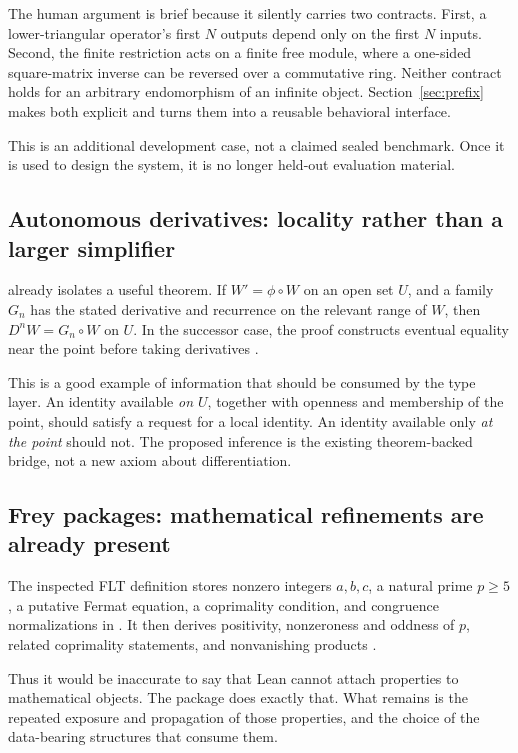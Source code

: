 \documentclass[11pt,a4paper]{article}
\newcommand{\code}[1]{\texttt{\detokenize{#1}}}
\theoremstyle{plain}
\theoremstyle{definition}
\begin{document}
The human argument is brief because it silently carries two contracts. First, a lower-triangular operator's first $N$ outputs depend only on the first $N$ inputs. Second, the finite restriction acts on a finite free module, where a one-sided square-matrix inverse can be reversed over a commutative ring. Neither contract holds for an arbitrary endomorphism of an infinite object. Section~\ref{sec:prefix} makes both explicit and turns them into a reusable behavioral interface.

This is an additional development case, not a claimed sealed benchmark. Once it is used to design the system, it is no longer held-out evaluation material.

\subsection{Autonomous derivatives: locality rather than a larger simplifier}
 already isolates a useful theorem. If $W'=\phi\circ W$ on an open set $U$, and a family $G_n$ has the stated derivative and recurrence on the relevant range of $W$, then $D^nW=G_n\circ W$ on $U$. In the successor case, the proof constructs eventual equality near the point before taking derivatives \cite{autonomous}.

This is a good example of information that should be consumed by the type layer. An identity available \emph{on $U$}, together with openness and membership of the point, should satisfy a request for a local identity. An identity available only \emph{at the point} should not. The proposed inference is the existing theorem-backed bridge, not a new axiom about differentiation.

\subsection{Frey packages: mathematical refinements are already present}
The inspected FLT definition stores nonzero integers $a,b,c$, a natural prime $p\ge5$, a putative Fermat equation, a coprimality condition, and congruence normalizations in \code{FreyPackage}. It then derives positivity, nonzeroness and oddness of $p$, related coprimality statements, and nonvanishing products \cite{frey}.

Thus it would be inaccurate to say that Lean cannot attach properties to mathematical objects. The package does exactly that. What remains is the repeated exposure and propagation of those properties, and the choice of the data-bearing structures that consume them.
\end{document}
